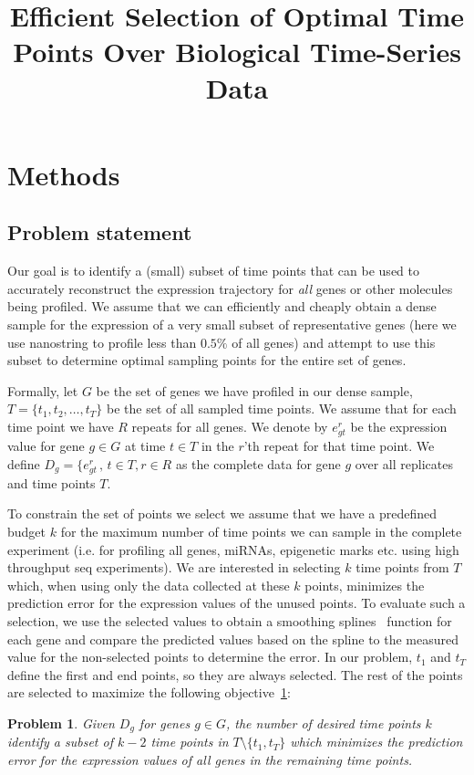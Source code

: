 \documentclass[10pt]{article}
\newtheorem{problem}{Problem}
\begin{document}
\title{Efficient Selection of Optimal Time Points Over Biological Time-Series Data}
\date{}

\maketitle

\section{Methods}

\subsection{Problem statement}
Our goal is to identify a (small) subset of time points that can be
used to accurately reconstruct the expression trajectory for {\em
all} genes or other molecules being profiled. We assume that we can
efficiently and cheaply obtain a dense sample for the expression of
a very small subset of representative genes (here we use nanostring
to profile less than $0.5\%$ of all genes) and attempt to use this
subset to determine optimal sampling points for the entire set of
genes.

Formally, let $G$ be the set of genes we have profiled in our dense
sample, $T = \{t_{1}, t_{2}, \ldots, t_{T}\}$ be the set of all
sampled time points. We assume that for each time point we have $R$
repeats for all genes. We denote by $e_{gt}^{r}$ be the expression
value for gene $g \in G$ at time $t \in T$ in the $r$'th repeat for
that time point. We define $D_{g} = \{e_{gt}^{r}\,,\, t \in T, r \in
R$ as the complete data for gene $g$ over all replicates and time
points $T$.

To constrain the set of points we select we assume that we have a
predefined budget $k$ for the maximum number of time points we can
sample in the complete experiment (i.e. for profiling all genes, miRNAs, epigenetic marks etc. using high throughput seq
experiments). We are interested in selecting $k$ time points from
$T$ which, when using only the data collected at these $k$ points,
minimizes the prediction error for the expression values of the
unused points. To evaluate such a selection, we use the selected
values to obtain a smoothing splines~\cite{deboor, bar2003,
wahba1990} function for each gene and compare the predicted values
based on the spline to the measured value for the non-selected
points to determine the error. In our problem, $t_{1}$ and $t_{T}$
define the first and end points, so they are always selected. The
rest of the points are selected to maximize the following
objective~\ref{prob:prob1}:
%
\begin{problem}\label{prob:prob1}
Given $D_{g}$ for genes $g \in G$, the number of desired time points
$k$ identify a subset of $k-2$ time points in $T \setminus \{t_{1},
t_{T}\}$ which minimizes the prediction error for the expression
values of all genes in the remaining time points.
\end{problem}
\end{document}
